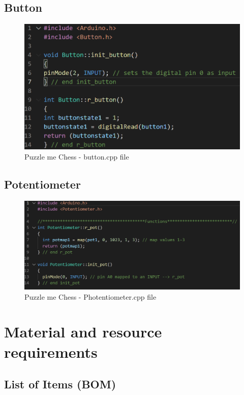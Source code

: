 \documentclass[11pt]{article}
\begin{document}
\subsection{Button}

\begin{figure}
  \includegraphics[width=\linewidth]{./Pics/buttoncpp.PNG}
  \caption{Puzzle me Chess - button.cpp file}
  \label{fig:button}
\end{figure}

\subsection{Potentiometer}

\begin{figure}
  \includegraphics[width=\linewidth]{./Pics/Potentiometercpp.PNG}
  \caption{Puzzle me Chess - Photentiometer.cpp file}
  \label{fig:Photentiometer}
\end{figure}

\section{Material and resource requirements}
\subsection{List of Items (BOM)}
\end{document}
